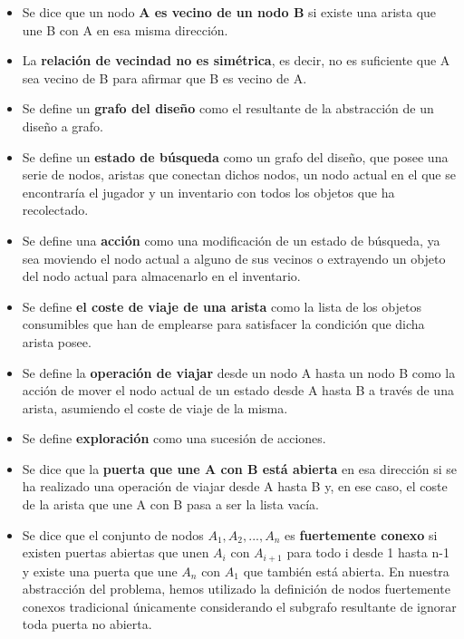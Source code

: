 \begin{itemize}
	\item Se dice que un nodo \textbf{A es vecino de un nodo B} si existe una arista que une B con A en esa misma dirección.
	
	\item La \textbf{relación de vecindad no es simétrica}, es decir, no es suficiente que A sea vecino de B para afirmar que B es vecino de A.
	
	\item Se define un \textbf{grafo del diseño} como el  resultante de la abstracción de un diseño a grafo.
	
	\item Se define un \textbf{estado de búsqueda} como un grafo del diseño, que posee una serie de nodos, aristas que conectan dichos nodos, un nodo actual en el que se encontraría el jugador y un inventario con todos los objetos que ha recolectado.
	
	\item Se define una \textbf{acción} como una modificación de un estado de búsqueda, ya sea moviendo el nodo actual a alguno de sus vecinos o extrayendo un objeto del nodo actual para almacenarlo en el inventario.
	
	\item Se define \textbf{el coste de viaje de una arista} como la lista de los objetos consumibles que han de emplearse para satisfacer la condición que dicha arista posee.
	
	\item Se define la \textbf{operación de viajar} desde un nodo A hasta un nodo B como la acción de mover el nodo actual de un estado desde A hasta B a través de una arista, asumiendo el coste de viaje de la misma.
	
	\item Se define \textbf{exploración} como una sucesión de acciones.
	
	\item Se dice que la \textbf{puerta que une A con B está abierta} en esa dirección si se ha realizado una operación de viajar desde A hasta B y, en ese caso, el coste de la arista que une A con B pasa a ser la lista vacía.
	
	\item Se dice que el conjunto de nodos ${A_1, A_2, ..., A_n}$ es \textbf{fuertemente conexo} \cite{NUUTILA19949} si existen puertas abiertas que unen $A_i$ con $A_{i+1}$ para todo i desde 1 hasta n-1 y existe una puerta que une $A_n$ con $A_1$ que también está abierta. En nuestra abstracción del problema, hemos utilizado la definición de nodos fuertemente conexos tradicional\cite{NUUTILA19949} únicamente considerando el subgrafo resultante de ignorar toda puerta no abierta.
	

\end{itemize}
